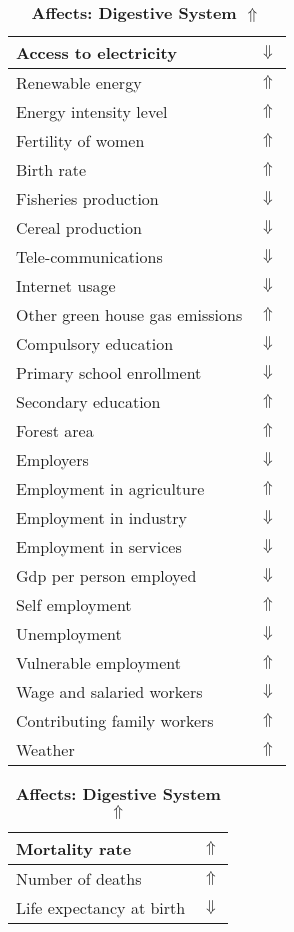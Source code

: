 \documentclass[12pt,notitlepage,oneside]{report}
\begin{document}
\begin{table}[!htb]
\caption{\textbf{Affects: Digestive System $\Uparrow$}}
\centering
\label{Correlated Socio-economic Factors0}
\begin{tabular}{|l|l|}
\hline
Access to electricity & $\Downarrow$\\ \hline
Renewable energy & $\Uparrow$\\ \hline
Energy intensity level & $\Uparrow$\\ \hline
Fertility of women & $\Uparrow$\\ \hline
Birth rate & $\Uparrow$\\ \hline
Fisheries production & $\Downarrow$\\ \hline
Cereal production & $\Downarrow$\\ \hline
Tele-communications & $\Downarrow$\\ \hline
Internet usage & $\Downarrow$\\ \hline
Other green house gas emissions & $\Uparrow$\\ \hline
Compulsory education & $\Downarrow$\\ \hline
Primary school enrollment & $\Downarrow$\\ \hline
Secondary education & $\Uparrow$\\ \hline
Forest area & $\Uparrow$\\ \hline
Employers & $\Downarrow$\\ \hline
Employment in agriculture & $\Uparrow$\\ \hline
Employment in industry & $\Downarrow$\\ \hline
Employment in services & $\Downarrow$\\ \hline
Gdp per person employed & $\Downarrow$\\ \hline
Self employment & $\Uparrow$\\ \hline
Unemployment & $\Downarrow$\\ \hline
Vulnerable employment & $\Uparrow$\\ \hline
Wage and salaried workers & $\Downarrow$\\ \hline
Contributing family workers & $\Uparrow$\\ \hline
Weather & $\Uparrow$\\ \hline
\end{tabular}
\begin{tabular}{|l|l|}
\hline
Mortality rate & $\Uparrow$\\ \hline
Number of deaths & $\Uparrow$\\ \hline
Life expectancy at birth & $\Downarrow$\\ \hline

\end{tabular}
\end{table}
\end{document}

